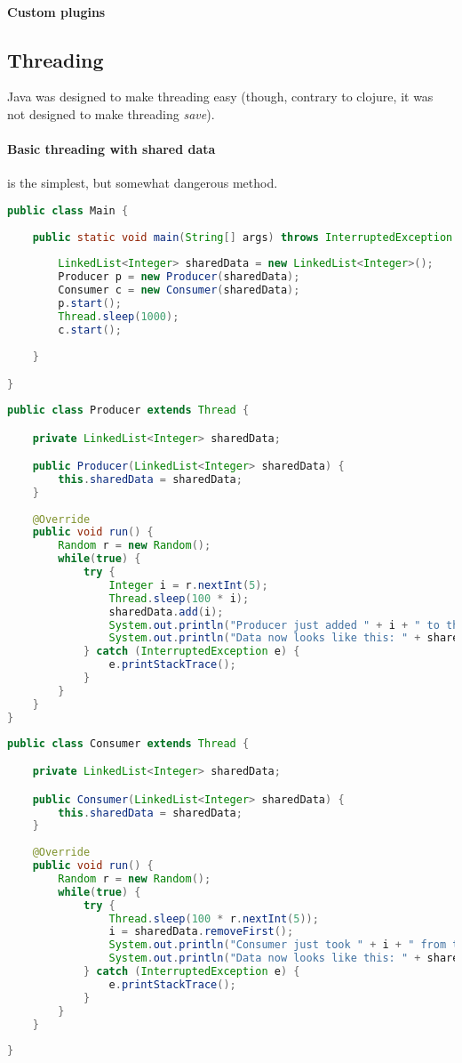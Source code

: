 \paragraph{Custom plugins}




\subsection{Threading}

Java was designed to make threading easy (though, contrary to clojure, it was not designed to make threading \emph{save}). 

\paragraph{Basic threading with shared data} is the simplest, but somewhat dangerous method. 
\begin{lstlisting}[language=java]
public class Main {
	
	public static void main(String[] args) throws InterruptedException {
		
		LinkedList<Integer> sharedData = new LinkedList<Integer>();
		Producer p = new Producer(sharedData);
		Consumer c = new Consumer(sharedData);
		p.start();
		Thread.sleep(1000);
		c.start();
		
	}

}
\end{lstlisting}
\begin{lstlisting}[language=java]
public class Producer extends Thread {

	private LinkedList<Integer> sharedData;

	public Producer(LinkedList<Integer> sharedData) {
		this.sharedData = sharedData;
	}
	
	@Override
	public void run() {
		Random r = new Random();
		while(true) {
			try {
			    Integer i = r.nextInt(5);
				Thread.sleep(100 * i);
    			sharedData.add(i);
    			System.out.println("Producer just added " + i + " to the shared data.");
    			System.out.println("Data now looks like this: " + sharedData.toString());
			} catch (InterruptedException e) {
				e.printStackTrace();
			}
		}
	}
}
\end{lstlisting}
\begin{lstlisting}[language=java]
public class Consumer extends Thread {

	private LinkedList<Integer> sharedData;

	public Consumer(LinkedList<Integer> sharedData) {
		this.sharedData = sharedData;
	}
	
	@Override
	public void run() {
		Random r = new Random();
		while(true) {
			try {
				Thread.sleep(100 * r.nextInt(5));
				i = sharedData.removeFirst();
    			System.out.println("Consumer just took " + i + " from the shared data.");
    			System.out.println("Data now looks like this: " + sharedData.toString());
			} catch (InterruptedException e) {
				e.printStackTrace();
			}
		}
	}
	
}
\end{lstlisting}

